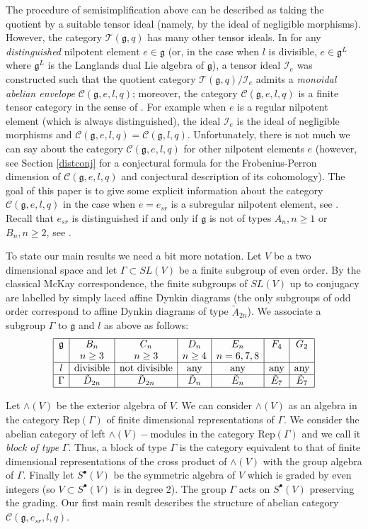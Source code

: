 \documentclass{amsart}
\theoremstyle{definition}
\newcommand{\C}{\mathcal{C}}
\newcommand{\g}{\mathfrak{g}}
\newcommand{\T}{\mathcal{T}}
\newcommand{\cI}{\mathcal{I}}
\numberwithin{equation}{section}
\begin{document}
The procedure of semisimplification above can be described as taking the quotient by a suitable
tensor ideal (namely, by the ideal of negligible morphisms). However, the category $\T(\g,q)$ has 
many other tensor ideals. In \cite{CEO} for any {\em distinguished} nilpotent element $e\in \g$ (or, in the case
when $l$ is divisible, $e\in \g^L$ where $\g^L$ is the Langlands dual Lie algebra of $\g$),
a tensor ideal $\cI_e$ was constructed such that the quotient category $\T(\g,q)/\cI_e$ admits a {\em monoidal
abelian envelope} $\C(\g,e,l,q)$; moreover, the category $\C(\g,e,l,q)$ is a finite tensor category
in the sense of \cite{EOfinite}. For example when $e$ is a regular nilpotent element (which is always
distinguished), the ideal $\cI_e$ is the ideal of negligible morphisms and $\C(\g,e,l,q)=\C(\g,l,q)$.
Unfortunately, there is not much we can say about the category $\C(\g,e,l,q)$ for other nilpotent
elements $e$ (however, see Section \ref{distconj} for a conjectural formula for the Frobenius-Perron dimension
of $\C(\g,e,l,q)$ and conjectural description of its cohomology). The goal of this paper is to give 
some explicit information about the category $\C(\g,e,l,q)$ in the case when $e=e_{sr}$ is a subregular
nilpotent element, see \cite[4.2]{CMg}. Recall that $e_{sr}$ is distinguished if and only if $\g$ is not of
types $A_n, n\ge 1$ or $B_n, n\ge 2$, see \cite{CMg}.

To state our main results we need a bit more notation. Let $V$ be a two dimensional space and let
$\Gamma \subset SL(V)$ be a finite subgroup of even order. By the classical McKay correspondence,
the finite subgroups of $SL(V)$ up to conjugacy are labelled by simply laced affine Dynkin diagrams (the only
subgroups of odd order correspond to affine Dynkin diagrams of type $\tilde A_{2n}$). We associate
a subgroup $\Gamma$ to $\g$ and $l$ as above as follows:
\renewcommand{\arraystretch}{1.4}
$$
\begin{array}{|c|c|c|c|c|c|c|}
\hline
\g&B_n&C_n&D_n&E_n&F_4&G_2\\
&n\ge 3&n\ge 3&n\ge 4&n=6,7,8&&\\
\hline
l&\mbox{divisible}&\mbox{not divisible}&\mbox{any}&\mbox{any}&\mbox{any}&\mbox{any}\\
\hline
\Gamma &\tilde D_{2n} &\tilde D_{2n}&\tilde D_n&\tilde E_n&\tilde E_7&\tilde E_7\\
\hline
\end{array}
$$

Let $\wedge(V)$ be the exterior algebra of $V$. We can consider $\wedge(V)$ as an algebra in the category
$\mbox{Rep}(\Gamma)$ of finite dimensional representations of $\Gamma$. We consider the abelian
category of left $\wedge(V)-$modules in the category $\mbox{Rep}(\Gamma)$ and we call it
{\em block of type} $\Gamma$. Thus, a block of type $\Gamma$ is the category equivalent to that of finite dimensional
representations of the cross product of $\wedge(V)$ with the group algebra of $\Gamma$.
Finally let $S^\bullet(V)$ be the symmetric algebra of $V$ which is graded by even integers (so $V \subset
S^\bullet(V)$ is in degree 2). The group $\Gamma$ acts on $S^\bullet(V)$ preserving the grading.
Our first main result describes the structure of abelian category $\C(\g,e_{sr},l,q)$.
\end{document}
